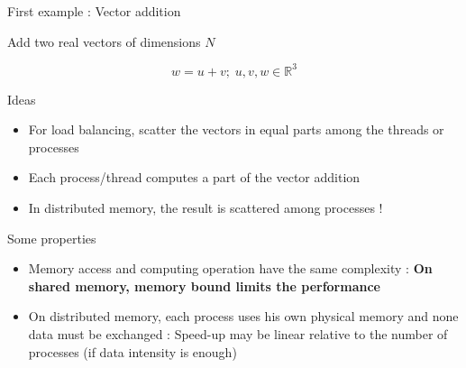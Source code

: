 \documentclass[compress,10pt,aspectratio=169]{beamer}
\begin{document}
\begin{frame}[fragile]{First example : Vector addition}
    \scriptsize
    \begin{center}\small Add two real vectors of dimensions $N$ \end{center}

    \[
        w = u + v;\; u,v,w\in\mathbb{R}^{3}
    \]

    \begin{block}{Ideas}
    \begin{itemize}
        \item For load balancing, scatter the vectors in equal parts among the threads or processes 
        \item Each process/thread computes a part of the vector addition
        \item \alert{In distributed memory, the result is scattered among processes !}
    \end{itemize}
    \end{block}

    \begin{block}{Some properties}
    \begin{itemize}
        \item Memory access and computing operation have the same complexity : 
              \textbf{On shared memory, memory bound limits the performance}
        \item On distributed memory, each process uses his own physical memory and none data must be 
              exchanged : Speed-up may be linear relative to the number of processes (if data
              intensity is enough)
    \end{itemize}
    \end{block}
\end{frame}
\end{document}
